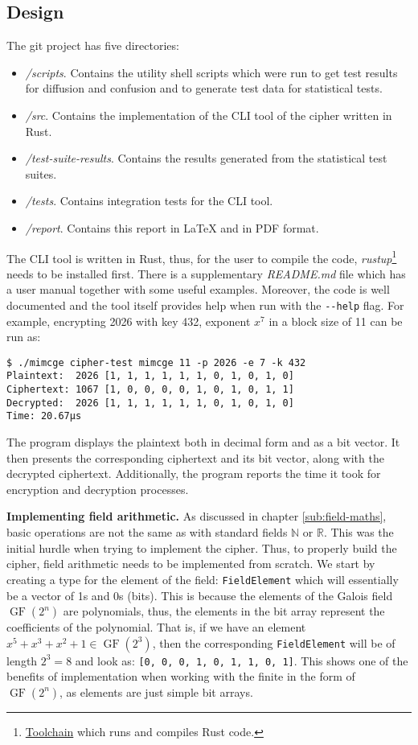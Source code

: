 \documentclass{Resources/UoBLab1}
\theoremstyle{definition}
\begin{document}
\subsection{Design}\label{sub:finite-field-impl}
The git project has five directories:
\begin{itemize}
    \item \textit{/scripts}. Contains the utility shell scripts which were run to get test results for diffusion and confusion and to generate test data for statistical tests.
    \item \textit{/src}. Contains the implementation of the CLI tool of the cipher written in Rust.
    \item \textit{/test-suite-results}. Contains the results generated from the statistical test suites.
    \item \textit{/tests}. Contains integration tests for the CLI tool.
    \item \textit{/report}. Contains this report in \LaTeX{} and in PDF format.
\end{itemize}
The CLI tool is written in Rust, thus, for the user to compile the code, \textit{rustup}\footnote{\href{https://www.rust-lang.org/tools/install}{Toolchain} which runs and compiles Rust code.} needs to be installed first. There is a supplementary \textit{README.md} file which has a user manual together with some useful examples. Moreover, the code is well documented and the tool itself provides help when run with the \verb|--help| flag. For example, encrypting 2026 with key 432, exponent $x^7$ in a block size of 11 can be run as:
\begin{verbatim}
$ ./mimcge cipher-test mimcge 11 -p 2026 -e 7 -k 432
Plaintext:  2026 [1, 1, 1, 1, 1, 1, 0, 1, 0, 1, 0]
Ciphertext: 1067 [1, 0, 0, 0, 0, 1, 0, 1, 0, 1, 1]
Decrypted:  2026 [1, 1, 1, 1, 1, 1, 0, 1, 0, 1, 0]
Time: 20.67µs
\end{verbatim}
The program displays the plaintext both in decimal form and as a bit vector. It then presents the corresponding ciphertext and its bit vector, along with the decrypted ciphertext. Additionally, the program reports the time it took for encryption and decryption processes.\medskip

\noindent\textbf{Implementing field arithmetic.} As discussed in chapter \ref{sub:field-maths}, basic operations are not the same as with standard fields $\mathbb{N}$ or $\mathbb{R}$. This was the initial hurdle when trying to implement the cipher. Thus, to properly build the cipher, field arithmetic needs to be implemented from scratch. We start by creating a type for the element of the field: \verb|FieldElement| which will essentially be a vector of 1s and 0s (bits). This is because the elements of the Galois field $\operatorname{GF}(2^n)$ are polynomials, thus, the elements in the bit array represent the coefficients of the polynomial. That is, if we have an element $x^5+x^3+x^2+1 \in \operatorname{GF}(2^3)$, then the corresponding \verb|FieldElement| will be of length $2^3 = 8$ and look as: \verb|[0, 0, 0, 1, 0, 1, 1, 0, 1]|. This shows one of the benefits of implementation when working with the finite in the form of $\operatorname{GF}(2^n)$, as elements are just simple bit arrays. 
\end{document}
